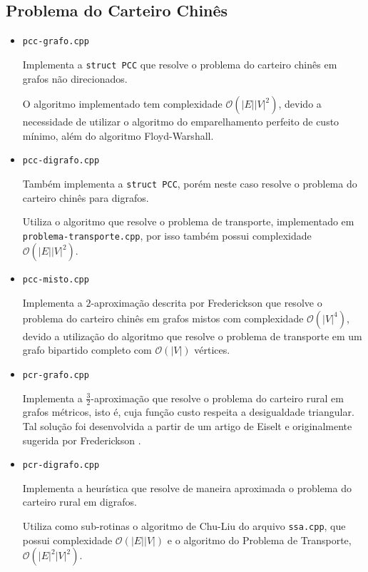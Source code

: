 \subsection{Problema do Carteiro Chinês}
\begin{itemize}
    \item \texttt{pcc-grafo.cpp}

        Implementa a \texttt{struct PCC} que resolve o problema do carteiro chinês em grafos não direcionados. 

        O algoritmo implementado tem complexidade $\mathcal{O}(|E||V|^2)$, devido a necessidade de utilizar o algoritmo do emparelhamento perfeito de custo mínimo, além do algoritmo Floyd-Warshall.
    \item \texttt{pcc-digrafo.cpp}

        Também implementa a \texttt{struct PCC}, porém neste caso resolve o problema do carteiro chinês para digrafos.

        Utiliza o algoritmo que resolve o problema de transporte, implementado em \texttt{problema-transporte.cpp}, por isso também possui complexidade $\mathcal{O}(|E||V|^2)$.
    \item \texttt{pcc-misto.cpp}

        Implementa a $2$-aproximação descrita por Frederickson \cite{frederickson} que resolve o problema do carteiro chinês em grafos mistos com complexidade $\mathcal{O}(|V|^4)$, devido a utilização do algoritmo que resolve o problema de transporte em um grafo bipartido completo com $\mathcal{O}(|V|)$ vértices.

    \item \texttt{pcr-grafo.cpp}
        
        Implementa a $\frac{3}{2}$-aproximação que resolve o problema do carteiro rural em grafos métricos, isto é, cuja função custo respeita a desigualdade triangular.  
        Tal solução foi desenvolvida a partir de um artigo de Eiselt \cite{michel} e originalmente sugerida por Frederickson \cite{frederickson}.
        
    \item \texttt{pcr-digrafo.cpp}

        Implementa a heurística que resolve de maneira aproximada o problema do carteiro rural em digrafos.

        Utiliza como sub-rotinas o algoritmo de Chu-Liu do arquivo \texttt{ssa.cpp}, que possui complexidade $\mathcal{O}(|E||V|)$ e o algoritmo do Problema de Transporte, $\mathcal{O}(|E|^2|V|^2)$.


\end{itemize}
